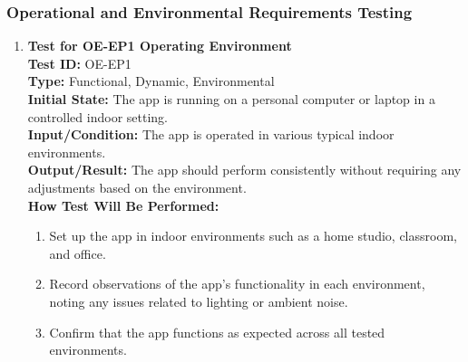 \documentclass[12pt, titlepage]{article}
\begin{document}
\subsubsection{Operational and Environmental Requirements Testing}
\begin{enumerate}
    \item \textbf{Test for OE-EP1 Operating Environment} \\
      \newline
      \textbf{Test ID:} OE-EP1 \\
      \textbf{Type:} Functional, Dynamic, Environmental \\
      \textbf{Initial State:} The app is running on a personal computer or laptop in a controlled indoor setting. \\
      \textbf{Input/Condition:} The app is operated in various typical indoor environments. \\
      \textbf{Output/Result:} The app should perform consistently without requiring any adjustments based on the environment. \\
      \textbf{How Test Will Be Performed:}
      \begin{enumerate}
          \item Set up the app in indoor environments such as a home studio, classroom, and office.
          \item Record observations of the app's functionality in each environment, noting any issues related to lighting or ambient noise.
          \item Confirm that the app functions as expected across all tested environments.
      \end{enumerate}


\end{enumerate}
\end{document}
